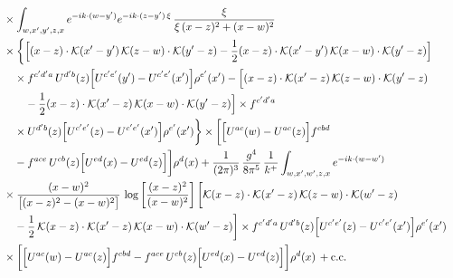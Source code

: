 \begin{align}
&\quad \times \int_{w,x',y',z,x}e^{-ik\cdot(w-y')}e^{-ik\cdot(z-y')\,\xi}\, \frac{\xi}{\xi\,(x-z)^{2}+(x-w)^{2}}\notag\\
&\quad \times\bigg\{\Big[(x-z)\cdot\mathcal{K}(x'-y')\, \mathcal{K}(z-w)\cdot\mathcal{K}(y'-z) -\frac{1}{2}(x-z)\cdot\mathcal{K}(x'-y')\, \mathcal{K}(x-w)\cdot\mathcal{K}(y'-z)\Big]\notag\\
&\quad\quad \times f^{c'd'a}\, U^{d'b}(z)\Big[U^{c'e'}(y')-U^{c'e'}(x')\Big]\rho^{e'}(x') -\Big[(x-z)\cdot\mathcal{K}(x'-z)\, \mathcal{K}(z-w)\cdot\mathcal{K}(y'-z)\notag\\
&\quad\quad\quad -\frac{1}{2}(x-z)\cdot\mathcal{K}(x'-z)\, \mathcal{K}(x-w)\cdot\mathcal{K}(y'-z)\Big] \times f^{c'd'a}\notag\\
&\quad\quad \times U^{d'b}(z)\Big[U^{c'e'}(z)-U^{c'e'}(x')\Big]\rho^{e'}(x')\bigg\} \times\bigg[\Big[U^{ac}(w)-U^{ac}(z)\Big]f^{cbd}\notag\\
&\quad\quad -f^{ace}\, U^{cb}(z)\Big[U^{ed}(x)-U^{ed}(z)\Big]\bigg]\rho^{d}(x) +\frac{1}{(2\pi)^{3}}\, \frac{g^{4}}{8\pi^{5}}\, \frac{1}{k^{+}} \int_{w,x',w',z,x}e^{-ik\cdot(w-w')}\notag\\
&\quad \times \frac{(x-w)^{2}}{\big[(x-z)^{2}-(x-w)^{2}\big]}\, \log\left[\frac{(x-z)^{2}}{(x-w)^{2}}\right] \bigg[\mathcal{K}(x-z)\cdot\mathcal{K}(x'-z)\, \mathcal{K}(z-w)\cdot\mathcal{K}(w'-z)\notag\\
&\quad\quad -\frac{1}{2}\, \mathcal{K}(x-z)\cdot\mathcal{K}(x'-z)\, \mathcal{K}(x-w)\cdot\mathcal{K}(w'-z)\bigg] \times f^{c'd'a}\, U^{d'b}(z)\Big[U^{c'e'}(z)-U^{c'e'}(x')\Big]\rho^{e'}(x')\notag\\
&\quad \times\bigg[\Big[U^{ac}(w)-U^{ac}(z)\Big]f^{cbd} -f^{ace}\, U^{cb}(z)\Big[U^{ed}(x)-U^{ed}(z)\Big]\bigg]\rho^{d}(x)\, +{\rm c.c.}
\end{align}
\endgroup
